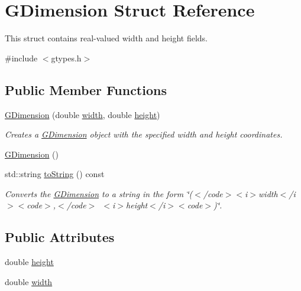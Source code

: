 \hypertarget{structGDimension}{}\section{G\+Dimension Struct Reference}
\label{structGDimension}


This struct contains real-\/valued width and height fields.  




{\ttfamily \#include $<$gtypes.\+h$>$}

\subsection*{Public Member Functions}
\begin{DoxyCompactItemize}
\item 
\mbox{\hyperlink{structGDimension_a0b3f30cd49c082f8e0245af828bd9000}{G\+Dimension}} (double \mbox{\hyperlink{structGDimension_a9df23e056f5d1a0388cd8190431c0e03}{width}}, double \mbox{\hyperlink{structGDimension_a89f6abd564014faeff7cd20c340a9c7d}{height}})
\begin{DoxyCompactList}\small\item\em Creates a {\ttfamily \mbox{\hyperlink{structGDimension}{G\+Dimension}}} object with the specified {\ttfamily width} and {\ttfamily height} coordinates. \end{DoxyCompactList}\item 
\mbox{\hyperlink{structGDimension_aedebfb3f99b96fb04c9f16926d11fcc5}{G\+Dimension}} ()
\item 
std\+::string \mbox{\hyperlink{structGDimension_a1fe5121d6528fdea3f243321b3fa3a49}{to\+String}} () const
\begin{DoxyCompactList}\small\item\em Converts the {\ttfamily \mbox{\hyperlink{structGDimension}{G\+Dimension}}} to a string in the form {\ttfamily \char`\"{}($<$/code$>$$<$i$>$width$<$/i$>$$<$code$>$,$<$/code$>$~$<$i$>$height$<$/i$>$$<$code$>$)\char`\"{}}. \end{DoxyCompactList}\end{DoxyCompactItemize}
\subsection*{Public Attributes}
\begin{DoxyCompactItemize}
\item 
double \mbox{\hyperlink{structGDimension_a89f6abd564014faeff7cd20c340a9c7d}{height}}
\item 
double \mbox{\hyperlink{structGDimension_a9df23e056f5d1a0388cd8190431c0e03}{width}}
\end{DoxyCompactItemize}



